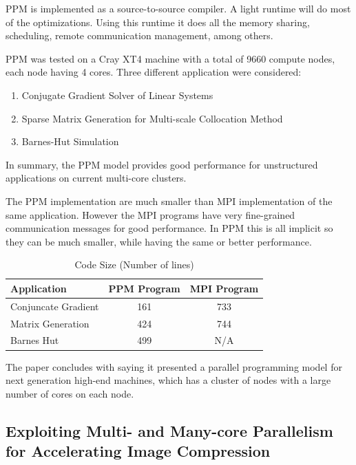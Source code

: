 PPM is implemented as a source-to-source compiler. A light runtime will do most
of the optimizations. Using this runtime it does all the memory sharing,
scheduling, remote communication management, among others.

PPM was tested on a Cray XT4 machine with a total of 9660 compute nodes, each
node having 4 cores. Three different application were considered:

\begin{enumerate}
	\item Conjugate Gradient Solver of Linear Systems
	\item Sparse Matrix Generation for Multi-scale Collocation Method
	\item Barnes-Hut Simulation
\end{enumerate}

In summary, the PPM model provides good performance for unstructured
applications on current multi-core clusters.

The PPM implementation are much smaller than MPI implementation of the same
application. However the MPI programs have very fine-grained communication
messages for good performance. In PPM this is all implicit so they can be
much smaller, while having the same or better performance.

\begin{table}
	\caption{Code Size (Number of lines)}
	\label{tab:code-size}
	\centering
	\begin{tabular}[!h]{|l|c|c|}
		\hline
		Application				& PPM Program	& MPI Program 	\\ \hline
		Conjuncate Gradient		& 161			& 733			\\ \hline
		Matrix Generation		& 424			& 744			\\ \hline
		Barnes Hut				& 499			& N/A			\\ \hline
	\end{tabular}
\end{table}

The paper concludes with saying it presented a parallel programming model for
next generation high-end machines, which has a cluster of nodes with a large
number of cores on each node.



\subsection{Exploiting Multi- and Many-core Parallelism for Accelerating Image Compression}


